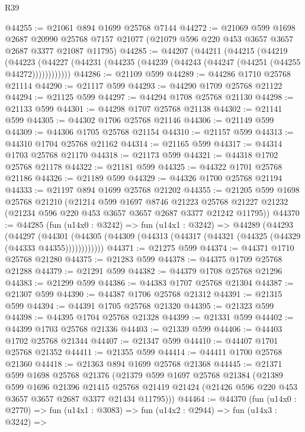 \begin{lexlean}{R39}
\begin{coremodule}
@44255 := @21061 @894 @1699 @25768 @7144
@44272 := @21069
    @599
    @1698
    @2687
    @20990
    @25768
    @7157
    @21077
    (@21079 @596 @220 @453 @3657 @3657 @2687 @3377 @21087 @11795)
@44285 := @44207
    (@44211
      (@44215
        (@44219
          (@44223 (@44227 (@44231 (@44235 (@44239 (@44243 (@44247 (@44251 (@44255 @44272))))))))))))
@44286 := @21109 @599
@44289 := @44286 @1710 @25768 @21114
@44290 := @21117 @599
@44293 := @44290 @1709 @25768 @21122
@44294 := @21125 @599
@44297 := @44294 @1708 @25768 @21130
@44298 := @21133 @599
@44301 := @44298 @1707 @25768 @21138
@44302 := @21141 @599
@44305 := @44302 @1706 @25768 @21146
@44306 := @21149 @599
@44309 := @44306 @1705 @25768 @21154
@44310 := @21157 @599
@44313 := @44310 @1704 @25768 @21162
@44314 := @21165 @599
@44317 := @44314 @1703 @25768 @21170
@44318 := @21173 @599
@44321 := @44318 @1702 @25768 @21178
@44322 := @21181 @599
@44325 := @44322 @1701 @25768 @21186
@44326 := @21189 @599
@44329 := @44326 @1700 @25768 @21194
@44333 := @21197 @894 @1699 @25768 @21202
@44355 := @21205
    @599
    @1698
    @25768
    @21210
    (@21214
      @599
      @1697
      @8746
      @21223
      @25768
      @21227
      @21232
      (@21234 @596 @220 @453 @3657 @3657 @2687 @3377 @21242 @11795))
@44370 := @44285
    (fun (u14x0 : @3242) =>
    fun (u14x1 : @3242) =>
    @44289
      (@44293
        (@44297
          (@44301 (@44305 (@44309 (@44313 (@44317 (@44321 (@44325 (@44329 (@44333 @44355))))))))))))
@44371 := @21275 @599
@44374 := @44371 @1710 @25768 @21280
@44375 := @21283 @599
@44378 := @44375 @1709 @25768 @21288
@44379 := @21291 @599
@44382 := @44379 @1708 @25768 @21296
@44383 := @21299 @599
@44386 := @44383 @1707 @25768 @21304
@44387 := @21307 @599
@44390 := @44387 @1706 @25768 @21312
@44391 := @21315 @599
@44394 := @44391 @1705 @25768 @21320
@44395 := @21323 @599
@44398 := @44395 @1704 @25768 @21328
@44399 := @21331 @599
@44402 := @44399 @1703 @25768 @21336
@44403 := @21339 @599
@44406 := @44403 @1702 @25768 @21344
@44407 := @21347 @599
@44410 := @44407 @1701 @25768 @21352
@44411 := @21355 @599
@44414 := @44411 @1700 @25768 @21360
@44418 := @21363 @894 @1699 @25768 @21368
@44445 := @21371
    @599
    @1698
    @25768
    @21376
    (@21379
      @599
      @1697
      @25768
      @21384
      (@21389
        @599
        @1696
        @21396
        @21415
        @25768
        @21419
        @21424
        (@21426 @596 @220 @453 @3657 @3657 @2687 @3377 @21434 @11795)))
@44464 := @44370
    (fun (u14x0 : @2770) =>
    fun (u14x1 : @3083) =>
    fun (u14x2 : @2944) =>
    fun (u14x3 : @3242) =>

\end{coremodule}
\end{lexlean}
